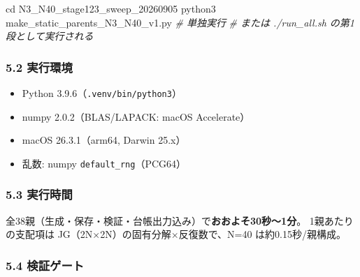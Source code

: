 \documentclass[
  a4paper,
]{ltjsarticle}
\newenvironment{Shaded}{}{}
\newcommand{\BuiltInTok}[1]{\textcolor[rgb]{0.00,0.50,0.00}{#1}}
\newcommand{\CommentTok}[1]{\textcolor[rgb]{0.38,0.63,0.69}{\textit{#1}}}
\newcommand{\ExtensionTok}[1]{#1}
\newcommand{\NormalTok}[1]{#1}
\providecommand{\tightlist}{%
  \setlength{\itemsep}{0pt}\setlength{\parskip}{0pt}}
\begin{document}
\begin{Shaded}
\begin{Highlighting}[]
\BuiltInTok{cd}\NormalTok{ N3\_N40\_stage123\_sweep\_20260905}
\ExtensionTok{python3}\NormalTok{ make\_static\_parents\_N3\_N40\_v1.py      }\CommentTok{\# 単独実行}
\CommentTok{\# または ./run\_all.sh の第1段として実行される}
\end{Highlighting}
\end{Shaded}

\subsubsection{5.2 実行環境}\label{ux5b9fux884cux74b0ux5883}

\begin{itemize}
\tightlist
\item
  Python 3.9.6（\texttt{.venv/bin/python3}）
\item
  numpy 2.0.2（BLAS/LAPACK: macOS Accelerate）
\item
  macOS 26.3.1（arm64, Darwin 25.x）
\item
  乱数: numpy \texttt{default\_rng}（PCG64）
\end{itemize}

\subsubsection{5.3 実行時間}\label{ux5b9fux884cux6642ux9593}

全38親（生成・保存・検証・台帳出力込み）で\textbf{おおよそ30秒〜1分}。
1親あたりの支配項は JG（2N×2N）の固有分解×反復数で、N=40
は約0.15秒/親構成。

\subsubsection{5.4 検証ゲート}\label{ux691cux8a3cux30b2ux30fcux30c8}
\end{document}
